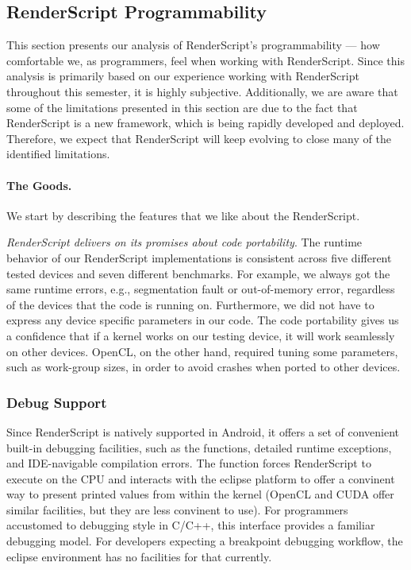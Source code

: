 \subsection{RenderScript Programmability}
This section presents our analysis of RenderScript's programmability --- how
comfortable we, as programmers, feel when working with RenderScript. Since this
analysis is primarily based on our experience working with RenderScript
throughout this semester, it is highly subjective. Additionally, we are aware
that some of the limitations presented in this section are due to the fact that
RenderScript is a new framework, which is being rapidly developed and deployed.
Therefore, we expect that RenderScript will keep evolving to close many of the
identified limitations.

\paragraph{The Goods.}
We start by describing the features that we like about the RenderScript.

\textit{RenderScript delivers on its promises about code portability}.
The runtime behavior of our RenderScript implementations is consistent across
five different tested devices and seven different benchmarks. For example, we
always got the same runtime errors, e.g., segmentation fault or out-of-memory
error, regardless of the devices that the code is running on. Furthermore, we
did not have to express any device specific parameters in our code. The code
portability gives us a confidence that if a kernel works on our testing device,
it will work seamlessly on other devices. OpenCL, on the other hand, required
tuning some
parameters, such as work-group sizes, in order to avoid crashes when ported to
other devices.

\subsubsection{Debug Support}

Since RenderScript is natively supported in Android,
it offers a set of convenient built-in debugging
facilities, such as the  functions, detailed runtime exceptions,
and IDE-navigable compilation errors.
The  function forces RenderScript to execute on the CPU and interacts 
with the eclipse platform to offer a convinent way to present printed values from within the kernel
(OpenCL and CUDA offer similar facilities, but they are less convinent to use).
For programmers accustomed to  debugging style in C/C++, this interface provides
a familiar debugging model. For developers expecting a breakpoint debugging workflow, the eclipse
environment has no facilities for that currently.


